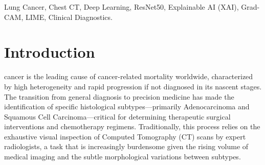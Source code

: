 
\begin{abstract}
Lung cancer remains a formidable global health challenge, necessitating not only high-accuracy detection but also precise classification of histological subtypes to guide personalized treatment. While deep learning has shown immense promise in automating radiological workflows, the clinical adoption of these models is often hampered by their "black-box" nature and the lack of human-interpretable evidence. This paper presents a multi-stage explainable diagnostic framework for lung cancer subtyping and malignancy detection in chest computed tomography (CT) scans. Our system employs a hierarchical architecture: a 4-class ResNet50-based classifier for subtype identification (Adenocarcinoma, Squamous Cell, Large Cell, and Normal tissue) and a secondary sector for binary malignancy assessment. To bridge the gap between algorithmic output and clinical trust, we integrate a dual-layer explainable AI (XAI) engine using Gradient-weighted Class Activation Mapping (Grad-CAM) and Local Interpretable Model-agnostic Explanations (LIME). The system achieves a classification accuracy of 95\% on subtyping, complemented by automated clinical narratives that localize nodules and provide histological context. Our results demonstrate that the synergy of hierarchical modeling and granular XAI can significantly enhance the reliability of AI-assisted oncology diagnostics.
\end{abstract}

\begin{IEEEkeywords}
Lung Cancer, Chest CT, Deep Learning, ResNet50, Explainable AI (XAI), Grad-CAM, LIME, Clinical Diagnostics.
\end{IEEEkeywords}

\section{Introduction}

 cancer is the leading cause of cancer-related mortality worldwide, characterized by high heterogeneity and rapid progression if not diagnosed in its nascent stages. The transition from general diagnosis to precision medicine has made the identification of specific histological subtypes—primarily Adenocarcinoma and Squamous Cell Carcinoma—critical for determining therapeutic surgical interventions and chemotherapy regimens. Traditionally, this process relies on the exhaustive visual inspection of Computed Tomography (CT) scans by expert radiologists, a task that is increasingly burdensome given the rising volume of medical imaging and the subtle morphological variations between subtypes.

